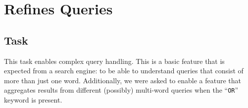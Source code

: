 \chapter{Refines Queries}



\section{Task} %
This task enables complex query handling. This is a basic feature that is expected from a search engine: to be able to understand queries that consist of more than just one word. Additionally, we were asked to enable a feature that aggregates results from different (possibly) multi-word queries when the ``{\tt OR}'' keyword is present.

